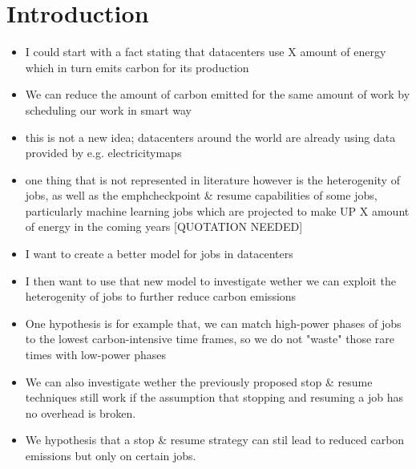 \chapter{Introduction}

\begin{itemize}
    \item I could start with a fact stating that datacenters use X amount of energy which in turn emits carbon for its production
    \item We can reduce the amount of carbon emitted for the same amount of work by scheduling our work in smart way
    \item this is not a new idea; datacenters around the world are already using data provided by e.g. electricitymaps
    \item one thing that is not represented in literature however is the heterogenity of jobs, as well as the emph{checkpoint \& resume} capabilities of some jobs, particularly machine learning jobs which are projected to make UP X amount of energy in the coming years [QUOTATION NEEDED] 
    \item I want to create a better model for jobs in datacenters
    \item I then want to use that new model to investigate wether we can exploit the heterogenity of jobs to further reduce carbon emissions
    \item One hypothesis is for example that, we can match high-power phases of jobs to the lowest carbon-intensive time frames, so we do not "waste" those rare times with low-power phases
    \item We can also investigate wether the previously proposed stop \& resume techniques still work if the assumption that stopping and resuming a job has no overhead is broken.
    \item We hypothesis that a stop \& resume strategy can stil lead to reduced carbon emissions but only on certain jobs.
\end{itemize}
